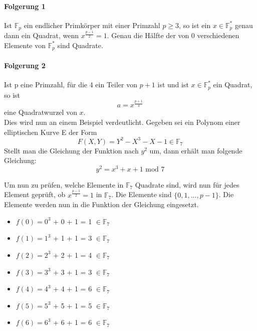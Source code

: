 \paragraph{Folgerung 1}
Ist $\mathbb{F}_p$ ein endlicher Primkörper mit einer Primzahl $p \geq 3$, so ist ein $x \in \mathbb{F}_p^*$ genau dann ein Quadrat, wenn $x^{\frac{p - 1}{2}} = 1$. Genau die Hälfte der von 0 verschiedenen Elemente von $\mathbb{F}_p^*$ sind Quadrate.

\paragraph{Folgerung 2}
Ist p eine Primzahl, für die 4 ein Teiler von $p + 1$ ist und ist $x \in \mathbb{F}_p^*$ ein Quadrat, so ist $$a = x^{\frac{p + 1}{4}}$$ eine Quadratwurzel von $x$.\\


Dies wird nun an einem Beispiel verdeutlicht. Gegeben sei ein Polynom einer elliptischen Kurve E der Form $$F(X, Y) = Y^{2} - X^{3} - X - 1 \in \mathbb{F}_{7}$$ Stellt man die Gleichung der Funktion nach $y^{2}$ um, dann erhält man folgende Gleichung: $$y^{2} =  x^{3} + x + 1 \text{ mod }7$$

Um nun zu prüfen, welche Elemente in $\mathbb{F}_{7}$ Quadrate sind, wird nun für jedes Element geprüft, ob $x^{\frac{p - 1}{2}} = 1$ in $\mathbb{F}_{7}$. Die Elemente sind $\{0, 1, ..., p - 1\}$. Die Elemente werden nun in die Funktion der Gleichung eingesetzt.

\begin{itemize}
\item $f(0) =  0^{3}$ + 0 + 1 = 1 $\in \mathbb{F}_{7}$
\item $f(1) =  1^{3}$ + 1 + 1 = 3 $\in \mathbb{F}_{7}$
\item $f(2) =  2^{3}$ + 2 + 1 = 4 $\in \mathbb{F}_{7}$
\item $f(3) =  3^{3}$ + 3 + 1 = 3 $\in \mathbb{F}_{7}$
\item $f(4) =  4^{3}$ + 4 + 1 = 6 $\in \mathbb{F}_{7}$
\item $f(5) =  5^{3}$ + 5 + 1 = 5 $\in \mathbb{F}_{7}$
\item $f(6) =  6^{3}$ + 6 + 1 = 6 $\in \mathbb{F}_{7}$
\end{itemize}

